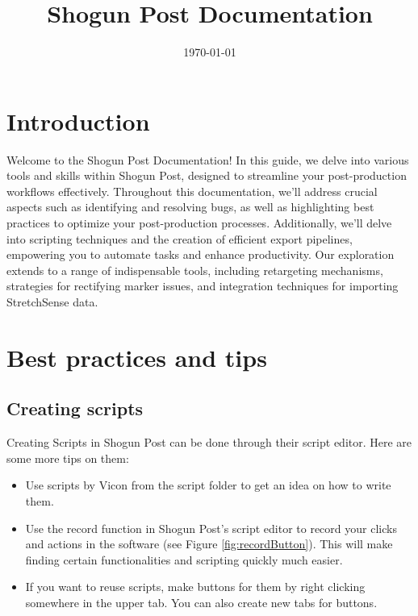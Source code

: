 \documentclass{uva-inf-article}
\title{Shogun Post Documentation}
\date{\today}
\begin{document}
\maketitle


\tableofcontents
\newpage
\section{Introduction}
Welcome to the Shogun Post Documentation! In this guide, we delve into various tools and skills within Shogun Post, designed to streamline your post-production workflows effectively. Throughout this documentation, we'll address crucial aspects such as identifying and resolving bugs, as well as highlighting best practices to optimize your post-production processes. Additionally, we'll delve into scripting techniques and the creation of efficient export pipelines, empowering you to automate tasks and enhance productivity.
Our exploration extends to a range of indispensable tools, including retargeting mechanisms, strategies for rectifying marker issues, and integration techniques for importing StretchSense data.

\section{Best practices and tips}

\subsection{Creating scripts}
Creating Scripts in Shogun Post can be done through their script editor. Here are some more tips on them:
\begin{itemize}
    \item Use scripts by Vicon from the script folder to get an idea on how to write them.
    \item Use the record function in Shogun Post's script editor to record your clicks and actions in the software (see Figure \ref{fig:recordButton}). This will make finding certain functionalities and scripting quickly much easier.
    \item If you want to reuse scripts, make buttons for them by right clicking somewhere in the upper tab. You can also create new tabs for buttons.
\end{itemize}
\end{document}
